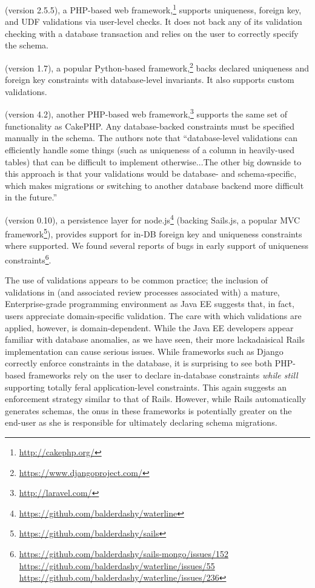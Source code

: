  (version 2.5.5), a PHP-based web
framework,\footnote{\url{http://cakephp.org/}} supports uniqueness,
foreign key, and UDF validations via user-level checks. It does not
back any of its validation checking with a database transaction and
relies on the user to correctly specify the schema.

 (version 1.7), a popular Python-based
framework,\footnote{\url{https://www.djangoproject.com/}} backs declared
uniqueness and foreign key constraints with database-level
invariants. It also supports custom validations.

 (version 4.2), another PHP-based web framework,\footnote{\url{http://laravel.com/}} supports the same
set of functionality as CakePHP. Any database-backed constraints must
be specified manually in the schema. The authors note that
``database-level validations can efficiently handle some things (such
as uniqueness of a column in heavily-used tables) that can be
difficult to implement otherwise...The other big downside to this
approach is that your validations would be database- and
schema-specific, which makes migrations or switching to another
database backend more difficult in the future.''

 (version 0.10), a persistence layer for
node.js\footnote{\url{https://github.com/balderdashy/waterline}} (backing
Sails.js, a popular MVC
framework\footnote{\url{https://github.com/balderdashy/sails}}),
provides support for in-DB foreign key and uniqueness constraints
where supported. We found several reports of bugs in early support of
uniqueness
constraints\footnote{\url{https://github.com/balderdashy/sails-mongo/issues/152}
  \url{https://github.com/balderdashy/waterline/issues/55}
  \url{https://github.com/balderdashy/waterline/issues/236}}.

 The use of validations appears to be common
practice; the inclusion of validations in (and associated review
processes associated with) a mature, Enterprise-grade programming
environment as Java EE suggests that, in fact, users appreciate
domain-specific validation. The care with which validations are
applied, however, is domain-dependent. While the Java EE developers
appear familiar with database anomalies, as we have seen, their more
lackadaisical Rails implementation can cause serious issues. While
frameworks such as Django correctly enforce constraints in the
database, it is surprising to see both PHP-based
frameworks rely on the user to declare in-database constraints
\textit{while still} supporting totally feral application-level
constraints. This again suggests an enforcement strategy similar to
that of Rails. However, while Rails automatically generates schemas,
the onus in these frameworks is potentially greater on the end-user as
she is responsible for ultimately declaring schema migrations.



